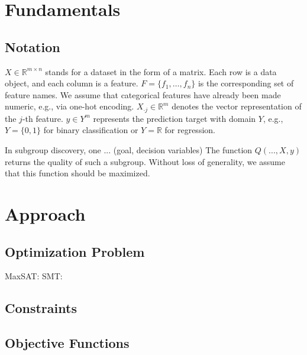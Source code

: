 \documentclass{article}
\theoremstyle{definition}
\begin{document}
\section{Fundamentals}
\label{sec:osd:fundamentals}

\cite{herrera2011overview} \cite{atzmueller2015subgroup} \cite{ventura2018subgroup}

\subsection{Notation}
\label{sec:osd:fundamentals:notation}

$X \in \mathbb{R}^{m \times n}$ stands for a dataset in the form of a matrix.
Each row is a data object, and each column is a feature.
$F = \{f_1, \dots, f_n\}$ is the corresponding set of feature names.
We assume that categorical features have already been made numeric, e.g., via one-hot encoding.
$X_{\cdot{}j} \in \mathbb{R}^m$ denotes the vector representation of the $j$-th feature.
$y \in Y^m$ represents the prediction target with domain $Y$, e.g., $Y=\{0,1\}$ for binary classification or $Y=\mathbb{R}$ for regression.

In subgroup discovery, one ... (goal, decision variables)
The function $Q(...,X,y)$ returns the quality of such a subgroup.
Without loss of generality, we assume that this function should be maximized.

\section{Approach}
\label{sec:osd:approach}

\subsection{Optimization Problem}
\label{sec:osd:approach:problem}

MaxSAT: \cite{li2021maxsat} \cite{bacchus2021maximum}
SMT: \cite{barrett2018satisfiability}

\subsection{Constraints}
\label{sec:osd:approach:constraints}

\cite{mosek2022modeling}
\cite{sinz2005towards}
\cite{ulrich2022selecting}

\subsection{Objective Functions}
\label{sec:osd:approach:objectives}
\end{document}
